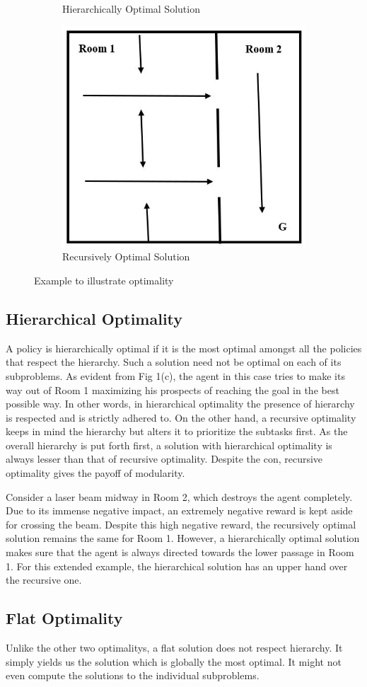 \begin{figure}[ht]
\begin{subfigure}[b]{0.5\linewidth}
    \caption{Hierarchically Optimal Solution} 
    \vspace{4ex}
  \end{subfigure}%
  \begin{subfigure}[b]{0.5\linewidth}
    \centering
    \includegraphics[width=.5\linewidth]{images/img4.JPG} 
    \caption{Recursively Optimal Solution} 
    \vspace{4ex}
  \end{subfigure} 
    \caption{Example to illustrate optimality}

\end{figure}




\subsection{Hierarchical Optimality}

A policy is hierarchically optimal if it is the most optimal amongst all the policies that respect the hierarchy. Such a solution need not be optimal on each of its subproblems. As evident from Fig 1(c), the agent in this case tries to make its way out of Room 1 maximizing his prospects of reaching the goal in the best possible way. In other words, in hierarchical optimality the presence of hierarchy is respected and is strictly adhered to. On the other hand, a recursive optimality keeps in mind the hierarchy but alters it to prioritize the subtasks first. As the overall hierarchy is put forth first, a solution with hierarchical optimality is always lesser than that of recursive optimality. Despite the con, recursive optimality gives the payoff of modularity. 

Consider a laser beam midway in Room 2, which destroys the agent completely. Due to its immense negative impact, an extremely negative reward is kept aside for crossing the beam. Despite this high negative reward, the recursively optimal solution remains the same for Room 1. However, a hierarchically optimal solution makes sure that the agent is always directed towards the lower passage in Room 1. For this extended example, the hierarchical solution has an upper hand over the recursive one. 


\subsection{Flat Optimality}

Unlike the other two optimalitys, a flat solution does not respect hierarchy. It simply yields us the solution which is globally the most optimal. It might not even compute the solutions to the individual subproblems. 
